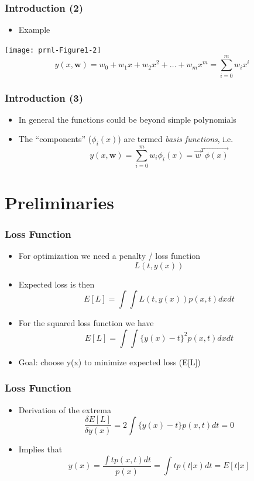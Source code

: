 \documentclass[10pt]{beamer}
\begin{document}
\begin{frame}
  \frametitle{Introduction (2)}
  \begin{itemize}
  \item Example
  \end{itemize}
  \begin{center}
    \texttt{[image: prml-Figure1-2]}
    \[
    y(x,{\mathbf w}) = w_0 + w_1 x + w_2 x^2 + \ldots + w_m x^m =
                       \sum_{i=0}^m w_i x^i
    \]
  \end{center}
\end{frame}

\begin{frame}
  \frametitle{Introduction (3)}
  \begin{itemize}
  \item In general the functions could be beyond simple polynomials
  \item The ``components'' ($\phi_{i}(x)$) are termed {\em basis functions}, i.e. 
    \[
    y(x, {\mathbf w}) = \sum_{i=0}^m w_i \phi_i(x) = \vec{w}^T
    \vec{\phi(x)}
    \]
  \end{itemize}
\end{frame}

\section{Preliminaries}

\begin{frame}
  \frametitle{Loss Function}
  \begin{itemize}
  \item For optimization we need a penalty / loss function
    \[
    L(t, y(x))
    \]
  \item Expected loss is then
    \[
    E[L] = \int \int L(t,y(x)) p(x,t) dx dt
    \]
  \item For the squared loss function we have
    \[
    E[L] = \int \int \{ y(x) - t \}^2 p(x,t) dx dt
    \]
  \item Goal: choose y(x) to minimize expected loss (E[L])
  \end{itemize}
\end{frame}

\begin{frame}
  \frametitle{Loss Function}
  \begin{itemize}
  \item Derivation of the extrema
    \[ \frac{\delta E[L]}{\delta y(x)} = 2 \int \{ y(x) - t \} p(x,t) dt = 0
    \]
  \item Implies that
    \[
    y(x) = \frac{\int t p(x,t) dt}{p(x)} = \int t p(t|x) dt = E[t|x]
    \]
  \end{itemize}
\end{frame}
\end{document}
